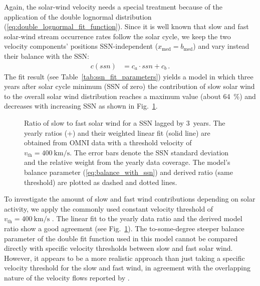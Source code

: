 \documentclass[]{aa}
\begin{document}
        Again, the solar-wind velocity needs a special treatment because of the application of the double lognormal distribution (\ref{eq:double_lognormal_fit_function}). Since it is well known that slow and fast solar-wind stream occurrence rates follow the solar cycle, we keep the two velocity components' positions SSN-independent ($x_\text{med} =  b_\text{med}$) and vary instead their balance with the SSN:
        \begin{align}
                c(ssn) &= c_a \cdot ssn + c_b\,.        \label{eq:balance_with_ssn}
        \end{align}
        The fit result (see Table~\ref{tab:ssn_fit_parameters}) yields a model in which three years after solar cycle minimum (SSN of zero) the contribution of slow solar wind to the overall solar wind distribution reaches a maximum value (about \SI{64}{\percent}) and decreases with increasing SSN as shown in Fig.~\ref{fig:Vdbl_SSN_ratio_f_plot}.
        \begin{figure}
                \caption{Ratio of slow to fast solar wind for a SSN lagged by 3~years. The yearly ratios (+) and their weighted linear fit (solid line) are obtained from OMNI data with a threshold velocity of $v_\text{th} = \SI{400}{\km\per\s}$. The error bars denote the SSN standard deviation and the relative weight from the yearly data coverage. The model's balance parameter (\ref{eq:balance_with_ssn}) and derived ratio (same threshold) are plotted as dashed and dotted lines.}
                \label{fig:Vdbl_SSN_ratio_f_plot}
        \end{figure}

        To investigate the amount of slow and fast wind contributions depending on solar activity, we apply the commonly used constant velocity threshold of $v_\text{th} = \SI{400}{\km\per\s}$ \citep[p.~144]{Schwenn1990}. The linear fit to the yearly data ratio and the derived model ratio show a good agreement (see Fig.~\ref{fig:Vdbl_SSN_ratio_f_plot}). The to-some-degree steeper balance parameter of the double fit function used in this model cannot be compared directly with specific velocity thresholds between slow and fast solar wind. However, it appears to be a more realistic approach than just taking a specific velocity threshold for the slow and fast wind, in agreement with the overlapping nature of the velocity flows reported by \citet{McGregor2011b}.
\end{document}
